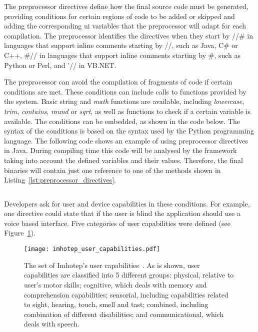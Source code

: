 The preprocessor directives define how the final source code must be generated, 
providing conditions for certain regions of code to be added or skipped and 
adding the corresponding \ac{ui} variables that the preprocessor will adapt for each
compilation. The preprocessor identifies the directives when they start by //\#
in languages that support inline comments starting by //, such as Java, C\# or
C++, \#// in languages that support inline comments starting by \#, such as 
Python or Perl, and '// in VB.NET.

The preprocessor can avoid the compilation of fragments of code if certain 
conditions are met. These conditions can include calls to functions provided 
by the system. Basic string and \textit{math} functions are available, including
\textit{lowercase}, \textit{trim}, \textit{contains}, \textit{round} or 
\textit{sqrt}, as well as functions to check if a certain variable is 
available. The conditions can be embedded, as shown in the code below. The 
syntax of the conditions is  based on the syntax used by the Python programming 
language. The following code shows an example of using preprocessor directives 
in Java. During compiling time this code will be analysed by the framework 
taking into account the defined variables and their values. Therefore, the final 
binaries will contain just one reference to one of the methods shown in 
Listing~\ref{lst:preprocessor_directives}.


\inputminted[linenos=true, fontsize=\footnotesize, frame=lines]{python}{5_experiments_and_results/preprocessor_directives.py}


Developers ask for user and device capabilities in these conditions. For 
example, one directive could state that if the user is blind the application 
should use a voice based interface. Five categories of user capabilities were 
defined (see Figure~\ref{fig:imhotep_user_capabilities}).


\begin{figure}[H]
\centering
\texttt{[image: imhotep\_user\_capabilities.pdf]}
\caption{The set of Imhotep's user capabilities~\citep{imhotep_website}. As is
shown, user capabilities are classified into 5 different groups: physical, 
relative to user's motor skills; cognitive, which deals with memory and 
comprehension capabilities; sensorial, including capabilities related to 
sight, hearing, touch, smell and tast; combined, including combination of 
different disabilities; and communicational, which deals with speech.}
\label{fig:imhotep_user_capabilities}
\end{figure}

